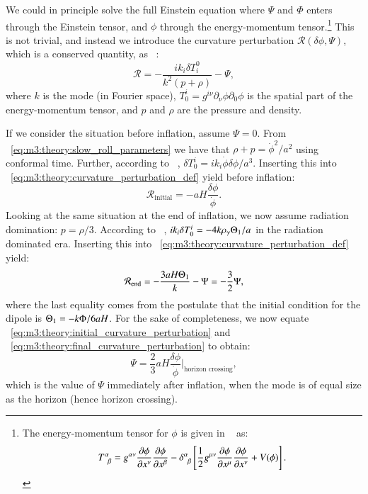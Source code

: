     We could in principle solve the full Einstein equation where $\Psi$ and $\Phi$ enters through the Einstein tensor, and $\phi$ through the energy-momentum tensor.\footnote{The energy-momentum tensor for $\phi$ is given in ~\cite[Eq. 7.6]{dodelson2020modern} as: $$ T^\alpha_{\;\;\beta}=g^{\alpha\nu}\pdv{\phi}{x^\nu}\pdv{\phi}{x^\beta}-\delta^\alpha_{\;\;\beta}\left[\frac{1}{2}g^{\mu\nu}\pdv{\phi}{x^\mu}\pdv{\phi}{x^\nu}+V(\phi)\right]. $$} This is not trivial, and instead we introduce the curvature perturbation $\mathcal{R}(\delta\phi, \Psi)$, which is a conserved quantity, as ~\cite{dodelson2020modern}:
    \begin{equation}\label{eq:m3:theory:curvature_perturbation_def}
        \mathcal{R} = -\frac{ik_i\delta T^0_i}{k^2(p+\rho)}-\Psi,
    \end{equation}
    where $k$ is the mode (in Fourier space), $T^i_0 = g^{i\nu}\partial_\nu\phi\partial_0\phi$ is the spatial part of the energy-momentum tensor, and $p$ and $\rho$ are the pressure and density. 

    If we consider the situation before inflation, assume $\Psi=0$. From ~\cref{eq:m3:theory:slow_roll_parameters} we have that $\rho+p=\dot{\phi}^2/a^2$ using conformal time. Further, according to ~\cite[Eq. 7.47]{dodelson2020modern}, $\delta T^i_0=ik_i\dot{\phi}\delta\phi/a^3$. Inserting this into ~\cref{eq:m3:theory:curvature_perturbation_def} yield before inflation:
    \begin{equation}\label{eq:m3:theory:initial_curvature_perturbation}
        \mathcal{R}_\mathrm{initial} = -aH\frac{\delta\phi}{\dot{\phi}}.
    \end{equation}
    Looking at the same situation at the end of inflation, we now assume radiation domination: $p=\rho/3$. According to ~\cite{dodelson2020modern}, $ik_i\delta T^i_0 = -4k\rho_\gamma\Theta_1/a$ in the radiation dominated era. Inserting this into ~\cref{eq:m3:theory:curvature_perturbation_def} yield:
    \begin{equation}\label{eq:m3:theory:final_curvature_perturbation}
        \mathcal{R}_\mathrm{end} = -\frac{3aH\Theta_1}{k}-\Psi = -\frac{3}{2}\Psi,
    \end{equation}
    where the last equality comes from the postulate that the initial condition for the dipole is $\Theta_1=-k\Phi/6aH$. For the sake of completeness, we now equate ~\cref{eq:m3:theory:initial_curvature_perturbation} and ~\cref{eq:m3:theory:final_curvature_perturbation} to obtain:
    \begin{equation}\label{eq:m3:theory:final_Psi_after_inflation}
        \Psi = \frac{2}{3}aH\frac{\delta\phi}{\dot{\phi}}\Big|_\text{horizon crossing},
    \end{equation}
    which is the value of $\Psi$ immediately after inflation, when the mode is of equal size as the horizon (hence horizon crossing).
